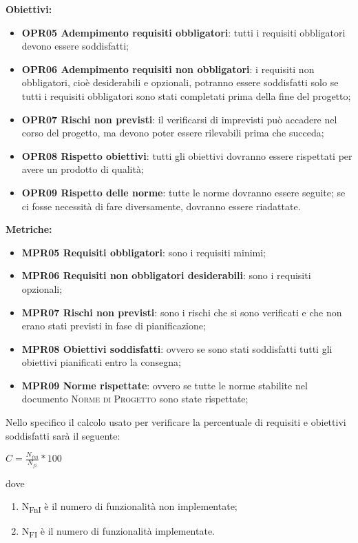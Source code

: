 \documentclass[../piano_di_qualifica.tex]{subfiles}
\begin{document}
\textbf{Obiettivi:}
\smallbreak
\begin{itemize}
	\item \textbf{OPR05 Adempimento requisiti obbligatori}: tutti i requisiti obbligatori devono essere soddisfatti;
	\item \textbf{OPR06 Adempimento requisiti non obbligatori}: i requisiti non obbligatori, cioè desiderabili e opzionali, potranno essere soddisfatti solo se tutti i requisiti obbligatori sono stati completati prima della fine del progetto;
	\item \textbf{OPR07 Rischi non previsti}: il verificarsi di imprevisti può accadere nel corso del progetto, ma devono poter essere rilevabili prima che succeda;
	\item \textbf{OPR08 Rispetto obiettivi}: tutti gli obiettivi dovranno essere rispettati per avere un prodotto di qualità;
	\item \textbf{OPR09 Rispetto delle norme}: tutte le norme dovranno essere seguite; se ci fosse necessità di fare diversamente, dovranno essere riadattate.
\end{itemize}

\textbf{Metriche:}
\smallbreak
\begin{itemize}
	\item \textbf{MPR05 Requisiti obbligatori}: sono i requisiti minimi;
	\item \textbf{MPR06 Requisiti non obbligatori desiderabili}: sono i requisiti opzionali;
	\item \textbf{MPR07 Rischi non previsti}: sono i rischi che si sono verificati e che non erano stati previsti in fase di pianificazione;
	\item \textbf{MPR08 Obiettivi soddisfatti}: ovvero se sono stati soddisfatti tutti gli obiettivi pianificati entro la consegna;
	\item \textbf{MPR09 Norme rispettate}: ovvero se tutte le norme stabilite nel documento \textsc{Norme di Progetto} sono state rispettate;
\end{itemize}

Nello specifico il calcolo usato per verificare la percentuale di requisiti e obiettivi soddisfatti sarà il seguente: \par
\begin{center}
	$C = \frac{N_{fni}}{N_{fi}} * 100$
\end{center}

dove
\begin{enumerate}
	\item N\textsubscript{FnI} è il numero di funzionalità non implementate;
	\item N\textsubscript{FI} è il numero di funzionalità implementate.
\end{enumerate}
\end{document}
